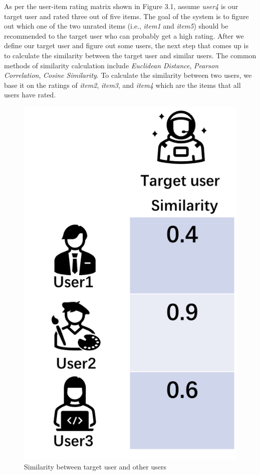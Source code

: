 As per the user-item rating matrix shown in Figure 3.1, assume \textit{user4} is our target user and rated three out of five items. The goal of the system is to figure out which one of the two unrated items (i.e., \textit{item1} and \textit{item5}) should be recommended to the target user who can probably get a high rating. After we define our target user and figure out some users, the next step that comes up is to calculate the similarity between the target user and similar users. The common methods of similarity calculation include \textit{Euclidean Distance}, \textit{Pearson Correlation}, \textit{Cosine Similarity}. To calculate the similarity between two users, we base it on the ratings of \textit{item2}, \textit{item3}, and \textit{item4} which are the items that all users have rated.
\begin{figure}[htbp]
\centering
\includegraphics[scale=0.5]{figure/rating2.png}
\caption{Similarity between target user and other users}
\end{figure}
